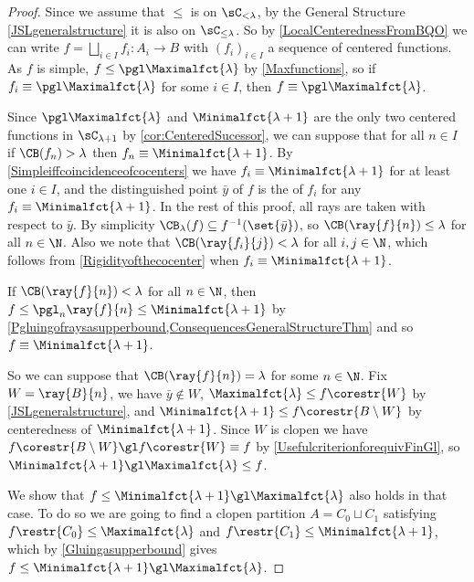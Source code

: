 \begin{proof}
Since we assume that $\leq$ is \bqo{} on $\sC_{<\lambda}$, by the General Structure \cref{JSLgeneralstructure} it is also \bqo{} on $\sC_{\leq\lambda}$. So by
\cref{LocalCenterednessFromBQO} we can write $f=\bigsqcup_{i\in I} f_i:A_i\to B$ with $(f_i)_{i\in I}$ a sequence of centered functions. As $f$ is simple, $f\leq \pgl\Maximalfct{\lambda}$ by \cref{Maxfunctions}, so  if $f_i\equiv\pgl\Maximalfct{\lambda}$ for some $i\in I$, then $f\equiv\pgl\Maximalfct{\lambda}$.

Since $\pgl\Maximalfct{\lambda}$ and $\Minimalfct{\lambda+1}$ are the only two centered functions in $\sC_{\lambda+1}$ by \cref{cor:CenteredSucessor},
we can suppose that for all $n\in I$ if $\CB(f_n)>\lambda$ then $f_n\equiv\Minimalfct{\lambda+1}$.
By \cref{Simpleiffcoincidenceofcocenters} we have $f_i\equiv \Minimalfct{\lambda+1}$ for at least one $i\in I$, and
the distinguished point $\bar{y}$ of $f$ is the \cocenter{} of $f_i$ for any $f_i\equiv\Minimalfct{\lambda+1}$.
In the rest of this proof, all rays are taken with respect to $\bar{y}$. 
By simplicity $\CB_\lambda(f)\subseteq f^{-1}(\set{\bar{y}})$, so $\CB(\ray{f}{n})\leq\lambda$ for all $n\in\N$.
Also we note that $\CB(\ray{f_i}{j})<\lambda$ for all $i,j\in \N$, {which follows from \cref{Rigidityofthecocenter} when $f_i\equiv\Minimalfct{\lambda+1}$.}

If $\CB(\ray{f}{n})<\lambda$ for all $n\in \N$, then $f \leq \pgl_n \ray{f}{n} \leq \Minimalfct{\lambda+1}$ by \cref{Pgluingofraysasupperbound,ConsequencesGeneralStructureThm} and so $f \equiv \Minimalfct{\lambda+1}$.

\smallskip

So we can suppose that $\CB(\ray{f}{n})=\lambda$ for some $n\in\N$. Fix $W=\ray{B}{n}$, we have $\bar{y}\notin W$, $\Maximalfct{\lambda}\leq f\corestr{W}$
by \cref{JSLgeneralstructure}, and $\Minimalfct{\lambda+1} \leq f\corestr{B\setminus W}$ by centeredness of $\Minimalfct{\lambda+1}$.
Since $W$ is clopen we have $f\corestr{B\setminus W}\gl f\corestr{W}\equiv f$ by \cref{UsefulcriterionforequivFinGl}, so $\Minimalfct{\lambda+1}\gl\Maximalfct{\lambda}\leq f$.

We show that $f\leq\Minimalfct{\lambda+1}\gl\Maximalfct{\lambda}$ also holds in that case.
To do so we are going to find a clopen partition $A=C_0\sqcup C_1$ satisfying
 $f\restr{C_0}\leq \Maximalfct{\lambda}$ and $f\restr{C_1}\leq \Minimalfct{\lambda+1}$, which by \cref{Gluingasupperbound}
 gives \(f\leq\Minimalfct{\lambda+1}\gl\Maximalfct{\lambda}\).



\end{proof}
